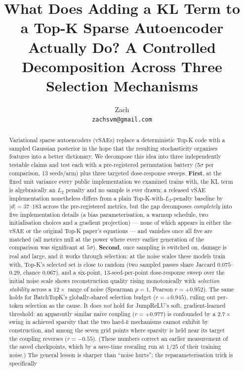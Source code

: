 \documentclass[11pt]{article}
\title{What Does Adding a KL Term to a Top-K Sparse Autoencoder\\
Actually Do? A Controlled Decomposition Across Three\\
Selection Mechanisms}
\author{Zach \\ \texttt{zachsvm@gmail.com}}
\date{}
\begin{document}
\maketitle

\begin{abstract}
Variational sparse autoencoders (vSAEs) replace a deterministic Top-K code with
a sampled Gaussian posterior in the hope that the resulting stochasticity
organises features into a better dictionary. We decompose this idea into three
independently testable claims and test each with a pre-registered permutation
battery (5$\sigma$ per comparison, 13 seeds/arm) plus three targeted
dose-response sweeps. \textbf{First}, at the fixed unit variance every public
implementation we examined trains with, the KL term is algebraically an $L_2$
penalty and no sample is ever drawn; a released vSAE implementation
nonetheless differs from a plain Top-K-with-$L_2$-penalty baseline by
$|d|=37$--$183$ across the pre-registered metrics, but the gap decomposes
\emph{completely} into five implementation details (a bias
parameterisation, a warmup schedule, two initialisation choices and a
gradient projection) --- none of which appears in either the vSAE or the
original Top-K paper's equations --- and vanishes once all five are matched
(all metrics null at the power where every earlier generation of the
comparison was significant at $5\sigma$). \textbf{Second}, once sampling is
switched on, damage is real and large, and it works through selection: at
the noise scales these models train with, Top-K's selected set is close to
random (two sampled passes share Jaccard $0.075$--$0.29$, chance $0.067$), and
a six-point, 13-seed-per-point dose-response sweep over the initial noise
scale shows reconstruction quality rising monotonically with
\emph{selection stability} across a $12\times$ range of noise (Spearman
$\rho=1$, Pearson $r=+0.952$). The same holds for BatchTopK's
globally-shared selection budget ($r=+0.945$), ruling out per-token
selection as the cause. It does \emph{not} hold for JumpReLU's soft,
gradient-learned threshold: an apparently similar naive coupling
($r=+0.977$) is confounded by a $2.7\times$ swing in achieved sparsity that
the two hard-$k$ mechanisms cannot exhibit by construction, and among the
seven grid points where sparsity is held near its target the coupling
reverses ($r=-0.55$). (These numbers correct an earlier measurement of the
saved checkpoints, which by a save-time rescaling run at $1/25$ of their
training noise.) The general lesson is
sharper than ``noise hurts'': the reparameterisation trick is specifically

\end{abstract}
\end{document}

